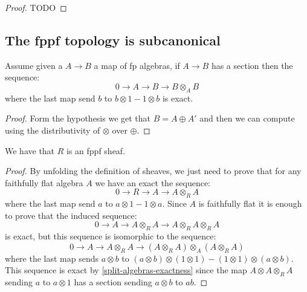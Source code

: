 \begin{proof}
TODO
\end{proof}


\subsection{The fppf topology is subcanonical}

\begin{lemma}\label{split-algebras-exactness}
Assume given a $A\to B$ a map of fp algebras, if $A\to B$ has a section then the sequence:
\[0 \to A \to B \to B\otimes_AB\]
where the last map send $b$ to $b\otimes 1 - 1 \otimes b$ is exact.
\end{lemma}

\begin{proof}
Form the hypothesis we get that $B = A\oplus A'$ and then we can compute using the distributivity of $\otimes$ over $\oplus$.
\end{proof}

\begin{proposition}
We have that $R$ is an fppf sheaf.
\end{proposition}

\begin{proof}
By unfolding the definition of sheaves, we just need to prove that for any faithfully flat algebra $A$ we have an exact the sequence:
\[0\to R\to A\to A\otimes_R A\]
where the last map send $a$ to $a\otimes 1 - 1 \otimes a$. Since $A$ is faithfully flat it is enough to prove that the induced sequence:
\[0 \to A \to A\otimes_RA\to A\otimes_RA\otimes_RA\]
is exact, but this sequence is isomorphic to the sequence:
\[0\to A\to A\otimes_RA \to (A\otimes_RA)\otimes_A(A\otimes_RA)\]
where the last map sends $a\otimes b$ to $(a\otimes b)\otimes (1\otimes 1) - (1\otimes 1)\otimes (a\otimes b)$. This sequence is exact by \cref{split-algebras-exactness} since the map $A\otimes A\otimes_RA$ sending $a$ to $a\otimes 1$ has a section sending $a\otimes b$ to $ab$. 
\end{proof}